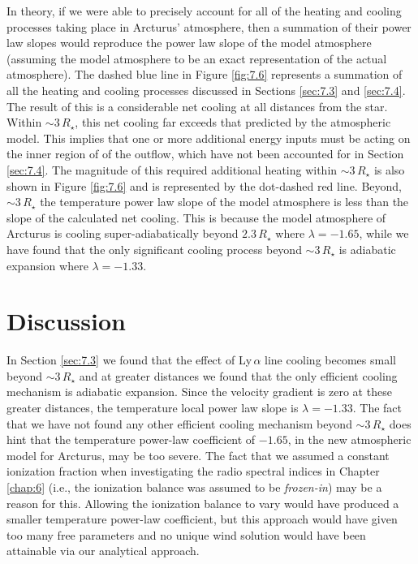 In theory, if we were able to precisely account for all of the heating and cooling processes taking place in Arcturus' atmosphere, then a summation of their power law slopes would reproduce the power law slope of the model atmosphere (assuming the model atmosphere to be an exact representation of the actual atmosphere). The dashed blue line in Figure \ref{fig:7.6} represents a summation of all the heating and cooling processes discussed in Sections  \ref{sec:7.3} and \ref{sec:7.4}. The result of this is a considerable net cooling at all distances from the star. Within $\sim 3\,R_{\star}$, this net cooling far exceeds that predicted by the atmospheric model. This implies that one or more additional energy inputs must be acting on the inner region of of the outflow, which have not been accounted for in Section \ref{sec:7.4}. The magnitude of this required additional heating within $\sim 3\,R_{\star}$ is also shown in Figure \ref{fig:7.6} and is represented by the dot-dashed red line. Beyond, $\sim 3\,R_{\star}$ the temperature power law slope of the model atmosphere is less than the slope of the calculated net cooling. This is because the model atmosphere of Arcturus is cooling super-adiabatically beyond $2.3\,R_{\star}$ where $\lambda = -1.65$, while we have found that the only significant cooling process beyond $\sim 3\,R_{\star}$ is adiabatic expansion where $\lambda = -1.33$. 

\section{Discussion}\label{sec:7.6}
In Section \ref{sec:7.3} we found that the effect of Ly\,$\alpha$ line cooling becomes small beyond $\sim 3\,R_{\star}$ and at greater distances we found that the only efficient cooling mechanism is adiabatic expansion. Since the velocity gradient is zero at these greater distances, the temperature local power law slope is $\lambda = -1.33$. The fact that we have not found any other efficient cooling mechanism beyond $\sim 3\,R_{\star}$ does hint that the temperature power-law coefficient of $-1.65$, in the new atmospheric model for Arcturus, may be too severe. The fact that we assumed a constant ionization fraction when investigating the radio spectral indices in Chapter \ref{chap:6} (i.e., the ionization balance was assumed to be \textit{frozen-in}) may be a reason for this. Allowing the ionization balance to vary would have produced a smaller temperature power-law coefficient, but this approach would have given too many free parameters and no unique wind solution would have been attainable via our analytical approach. 

